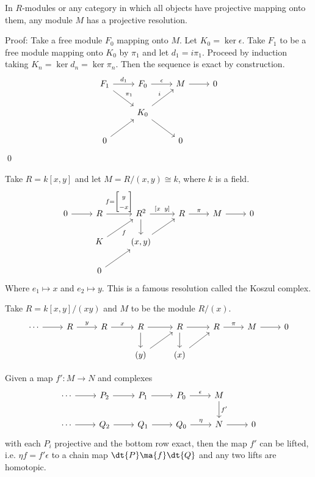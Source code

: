 \begin{prop}[Existence]
In $R$-modules or any category in which all objects have projective mapping onto them, any module $M$ has a projective resolution. 
\end{prop}

Proof: Take a free module $F_0$ mapping onto $M$. Let $K_0= \ker \epsilon$. Take $F_1$ to be a free module mapping onto $K_0$ by $\pi_1$ and let $d_1=i\pi_1$. Proceed by induction taking $K_n= \ker d_n=\ker \pi_n$. Then the sequence is exact by construction. 
\[
\begin{tikzcd}
F_1 \arrow{r}{d_1} \arrow{dr}{\pi_1} & F_0 \arrow{r}{\epsilon} & M \arrow{r} & 0 \\
& K_0 \arrow{ru}{i} \arrow{dr} & & \\
0 \arrow{ur} & & 0 &
\end{tikzcd}
\]
\qed \\

\begin{ex}
Take $R=k[x,y]$ and let $M=R/(x,y) \cong k$, where $k$ is a field. 
\[
\begin{tikzcd}
0 \arrow{r} & R \arrow{r}{f=\begin{bmatrix} y \\ -x \end{bmatrix}} & R^2 \arrow{r}{[x\;\;y]} \arrow{d} & R \arrow{r}{\pi} & M \arrow{r} & 0 \\
 & K \arrow[swap]{ru}{f} & (x,y) \arrow{ur} & & & \\
 & 0 \arrow{ur} & & & & 
\end{tikzcd}
\]
Where $e_1 \mapsto x$ and $e_2 \mapsto y$. This is a famous resolution called the Koszul complex. 
\end{ex}

\begin{ex}
Take $R=k[x,y]/(xy)$ and $M$ to be the module $R/(x)$. 
\[
\begin{tikzcd}
\cdots \arrow{r} & R \arrow{r}{y} & R \arrow{r}{x} & R \arrow{r} \arrow{d} & R \arrow{r} \arrow{d} & R \arrow{r}{\pi} & M \arrow{r} &0 \\
& & & (y) \arrow{ur} & (x) \arrow{ur} & &
\end{tikzcd}
\]
\end{ex}

\begin{thm}
Given a map $f': M \to N$ and complexes 
\[
\begin{tikzcd}
\cdots \arrow{r} & P_2 \arrow{r} & P_1 \arrow{r} & P_0 \arrow{r}{\epsilon} & M \arrow{d}{f'} & \\
\cdots \arrow{r} & Q_2 \arrow{r} & Q_1 \arrow{r} & Q_0 \arrow{r}{\eta} & N \arrow{r} & 0 
\end{tikzcd}
\]
with each $P_i$ projective and the bottom row exact, then the map $f'$ can be lifted, i.e. $\eta f=f' \epsilon$ to a chain map $\dt{P} \ma{f} \dt{Q}$ and any two lifts are homotopic. 
\end{thm}

